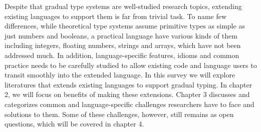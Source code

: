 Despite that gradual type systems are well-studied research topics,
extending existing languages to support them is far from trivial task.
To name few differences, while theoretical type systems assume primitive types as simple as just numbers and booleans,
a practical language have various kinds of them including integers, floating numbers, strings and arrays,
which have not been addressed much.
In addition, language-specific features, idioms and common practice needs
to be carefully studied to allow existing code and language users to transit smoothly into
the extended language. In this survey we will explore literatures that extends existing languages to support gradual typing.
In chapter 2, we will focus on benefits of making these extensions. Chapter 3 discusses and categorizes common and language-specific
challenges researchers have to face and solutions to them.
Some of these challenges, however, still remains as open questions, which will be covered in chapter 4.

